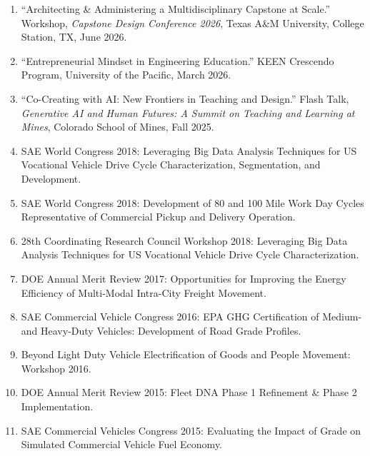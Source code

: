 \documentclass[11pt,letterpaper]{article}
\begin{document}
\begin{enumerate}
  \item ``Architecting \& Administering a Multidisciplinary Capstone at Scale.''
        Workshop, \textit{Capstone Design Conference 2026}, Texas A\&M University,
        College Station, TX, June 2026.

  \item ``Entrepreneurial Mindset in Engineering Education.''
        KEEN Crescendo Program, University of the Pacific, March 2026.

  \item ``Co-Creating with AI: New Frontiers in Teaching and Design.''
        Flash Talk, \textit{Generative AI and Human Futures: A Summit on Teaching and
        Learning at Mines}, Colorado School of Mines, Fall 2025.

  \item SAE World Congress 2018: Leveraging Big Data Analysis Techniques for US
        Vocational Vehicle Drive Cycle Characterization, Segmentation, and Development.

  \item SAE World Congress 2018: Development of 80 and 100 Mile Work Day Cycles
        Representative of Commercial Pickup and Delivery Operation.

  \item 28th Coordinating Research Council Workshop 2018: Leveraging Big Data Analysis
        Techniques for US Vocational Vehicle Drive Cycle Characterization.

  \item DOE Annual Merit Review 2017: Opportunities for Improving the Energy Efficiency
        of Multi-Modal Intra-City Freight Movement.

  \item SAE Commercial Vehicle Congress 2016: EPA GHG Certification of Medium- and
        Heavy-Duty Vehicles: Development of Road Grade Profiles.

  \item Beyond Light Duty Vehicle Electrification of Goods and People Movement:
        Workshop 2016.

  \item DOE Annual Merit Review 2015: Fleet DNA Phase 1 Refinement \& Phase 2
        Implementation.

  \item SAE Commercial Vehicles Congress 2015: Evaluating the Impact of Grade on
        Simulated Commercial Vehicle Fuel Economy.


\end{enumerate}
\end{document}
